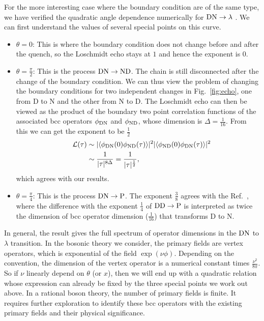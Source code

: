 For the more interesting case where the boundary condition are of the same type, we have verified the quadratic angle dependence numerically for ${\rm DN} \rightarrow \lambda$ {\iffalse \color{red}the process in Eq.~\eqref{eq:DNDN}.\fi}. We can first understand the values of several special points on this curve. 
\begin{itemize}
\item $\theta = 0$: This is where the boundary condition does not change before and after the quench, so the Loschmidt echo stays at $1$ and hence the exponent is $0$.
\item $\theta = \frac{\pi}{2}$: This is the process ${\rm DN}\rightarrow {\rm  ND}$. The chain is still disconnected after the change of the boundary condition. We can thus view the problem of changing the boundary conditions for two independent changes in Fig.~\ref{fig:echo}, one from D to N and the other from N to D. The Loschmidt echo can then be viewed as the product of the boundary two point correlation functions of the associated bcc operators $\phi_{\rm DN}$ and $\phi_{\rm ND}$, whose dimension is $\Delta = \frac{1}{16}$. From this we can get the exponent to be $\frac{1}{2}$
\begin{equation}
\begin{aligned}
  \quad \mathcal{L}(\tau) &\sim |\langle \phi_{{\rm D N}}(0) \phi_{{\rm ND}}(\tau)   \rangle |^2 
|\langle \phi_{{\rm ND}}(0)  \phi_{{\rm DN}}(\tau)   \rangle| ^2\\
& \sim \frac{1}{|\tau|^{8\Delta}} = \frac{1}{|\tau|^{\frac{1}{2}}},
\end{aligned}
\end{equation}
which agrees with our results. 
\item $\theta = \frac{\pi}{4}$: This is the process ${\rm DN}\rightarrow {\rm P}$. The exponent $\frac{3}{8}$ agrees with the Ref.~, where the difference with the exponent $\frac{1}{4}$ of ${\rm DD} \rightarrow {\rm P}$ is interpreted as twice the dimension of bcc operator dimension ($\frac{1}{16}$) that transforms D to N.
\end{itemize}
In general, the result gives the full spectrum of operator dimensions in the ${\rm DN}$ to $\lambda $ transition. In the bosonic theory we consider, the primary fields are vertex operators, which is exponential of the field $\exp( \nu \phi )$. Depending on the convention, the dimension of the vertex operator is a numerical constant times $\frac{\nu^2}{8\pi}$. So if $\nu$ linearly depend on $\theta$ (or $x$), then we will end up with a quadratic relation whose expression can already be fixed by the three special points we work out above. In a rational boson theory, the number of primary fields is finite. It requires further exploration to identify these bcc operators with the existing primary fields and their physical significance. 

